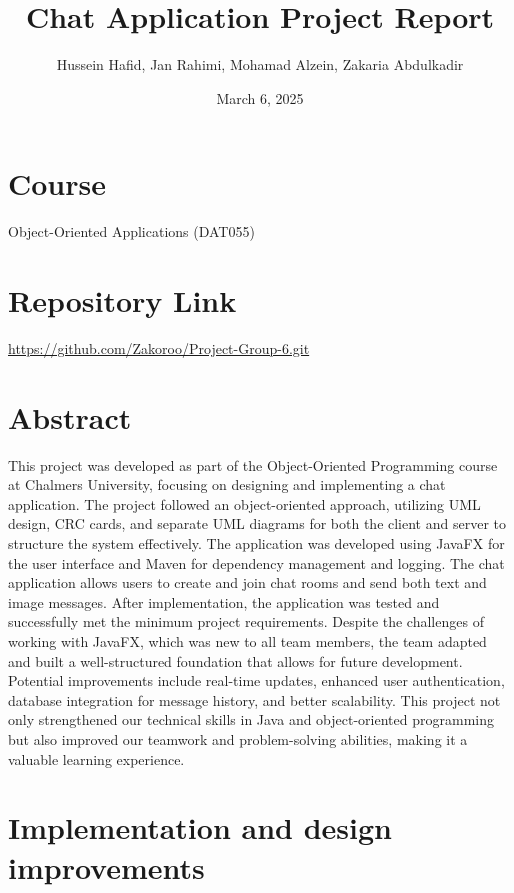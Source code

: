 \documentclass[a4paper,11pt]{article}
\title{Chat Application Project Report}
\author{Hussein Hafid, Jan Rahimi, Mohamad Alzein, Zakaria Abdulkadir}
\date{March 6, 2025}
\begin{document}
\justifying
{}

\maketitle

\section*{Course}
Object-Oriented Applications (DAT055)

\section*{Repository Link}
\url{https://github.com/Zakoroo/Project-Group-6.git}
\newpage

\section*{Abstract}
This project was developed as part of the Object-Oriented Programming course at Chalmers University, focusing on designing and implementing a chat application. The project followed an object-oriented approach, utilizing UML design, CRC cards, and separate UML diagrams for both the client and server to structure the system effectively. The application was developed using JavaFX for the user interface and Maven for dependency management and logging.
The chat application allows users to create and join chat rooms and send both text and image messages. After implementation, the application was tested and successfully met the minimum project requirements. Despite the challenges of working with JavaFX, which was new to all team members, the team adapted and built a well-structured foundation that allows for future development. Potential improvements include real-time updates, enhanced user authentication, database integration for message history, and better scalability.
This project not only strengthened our technical skills in Java and object-oriented programming but also improved our teamwork and problem-solving abilities, making it a valuable learning experience.



\newpage
\tableofcontents
\newpage
\listoffigures
\newpage
\listoftables
\newpage




\section{Implementation and design improvements}
\end{document}
